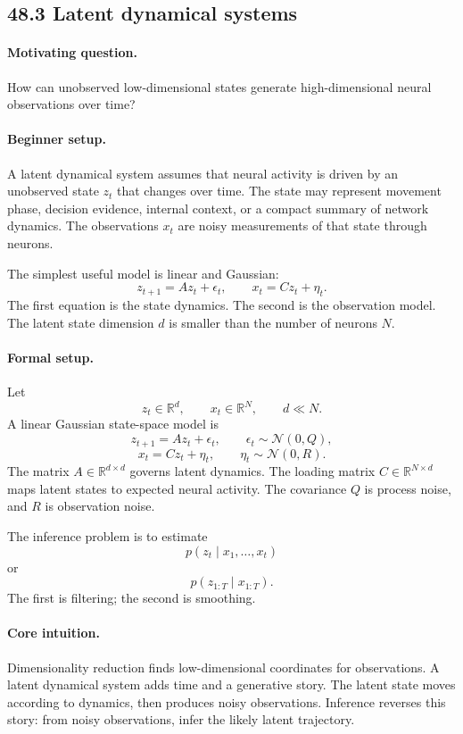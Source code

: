 \subsection{48.3 Latent dynamical systems}

\paragraph{Motivating question.}
How can unobserved low-dimensional states generate high-dimensional neural observations over time?

\paragraph{Beginner setup.}
A latent dynamical system assumes that neural activity is driven by an unobserved state \(z_t\) that changes over time. The state may represent movement phase, decision evidence, internal context, or a compact summary of network dynamics. The observations \(x_t\) are noisy measurements of that state through neurons.

The simplest useful model is linear and Gaussian:
\[
z_{t+1}=Az_t+\epsilon_t,
\qquad
x_t=Cz_t+\eta_t.
\]
The first equation is the state dynamics. The second is the observation model. The latent state dimension \(d\) is smaller than the number of neurons \(N\).

\paragraph{Formal setup.}
Let
\[
z_t\in\mathbb R^d,\qquad x_t\in\mathbb R^N,\qquad d\ll N.
\]
A linear Gaussian state-space model is
\[
\boxed{
z_{t+1}=Az_t+\epsilon_t,\qquad \epsilon_t\sim\mathcal N(0,Q),
}
\]
\[
\boxed{
x_t=Cz_t+\eta_t,\qquad \eta_t\sim\mathcal N(0,R).
}
\]
The matrix \(A\in\mathbb R^{d\times d}\) governs latent dynamics. The loading matrix \(C\in\mathbb R^{N\times d}\) maps latent states to expected neural activity. The covariance \(Q\) is process noise, and \(R\) is observation noise.

The inference problem is to estimate
\[
p(z_t\mid x_1,\ldots,x_t)
\]
or
\[
p(z_{1:T}\mid x_{1:T}).
\]
The first is filtering; the second is smoothing.

\paragraph{Core intuition.}
Dimensionality reduction finds low-dimensional coordinates for observations. A latent dynamical system adds time and a generative story. The latent state moves according to dynamics, then produces noisy observations. Inference reverses this story: from noisy observations, infer the likely latent trajectory.

